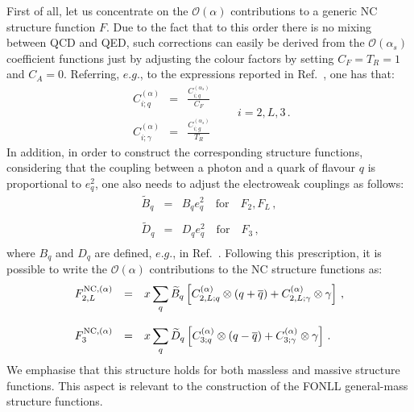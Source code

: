 First of all, let us concentrate on the $\mathcal{O}(\alpha)$
contributions to a generic NC structure function $F$.
%
Due to the fact that to this order there is no mixing between QCD and
QED, such corrections can easily be derived from the
$\mathcal{O}(\alpha_s)$ coefficient functions just by adjusting the
colour factors by setting $C_F=T_R=1$ and $C_A=0$.
%
Referring, $e.g.$, to the expressions reported in
Ref.~\cite{Ellis:1991qj}, one has that:
\begin{equation}\label{eq:alphaCFs}
\begin{array}{rcl}
\displaystyle C_{i;q}^{(\alpha)} &=& \displaystyle \frac{C_{i;q}^{(\alpha_s)}}{C_F}\\
\\
\displaystyle C_{i;\gamma}^{(\alpha)} &=& \displaystyle \frac{C_{i;g}^{(\alpha_s)}}{T_R}
\end{array}\qquad i = 2,L,3\,.
\end{equation}
In addition, in order to construct the corresponding structure
functions, considering that the coupling between a photon and a quark
of flavour $q$ is proportional to $e_q^2$, one also needs to adjust
the electroweak couplings as follows:
 \begin{equation}
\begin{array}{rcl}
\widetilde{B}_q &=& B_qe_q^2\quad\mbox{for}\quad F_2,F_L\,, \\
\\
\widetilde{D}_q &=& D_qe_q^2\quad\mbox{for}\quad F_3\,, \\
\end{array}
\end{equation}
where $B_q$ and $D_q$ are defined, $e.g.$, in
Ref.~\cite{Adloff:2003uh}.
%
Following this prescription, it is possible to write the
$\mathcal{O}(\alpha)$ contributions to the NC structure functions as:
\begin{equation}
\begin{array}{rcl}
F_{2,L}^{{\rm NC},(\alpha)} &=& \displaystyle x \sum_{q} \widetilde{B}_q\left[C_{2,L;q}^{(\alpha)}\otimes
(q+\overline{q}) + C_{2,L;\gamma}^{(\alpha)} \otimes \gamma
                         \right]\,,\\
\\
F_3^{{\rm NC},(\alpha)} &=& \displaystyle x \sum_{q} \widetilde{D}_q\left[C_{3;q}^{(\alpha)}\otimes
(q-\overline{q}) + C_{3;\gamma}^{(\alpha)} \otimes \gamma
                         \right]\,.
\end{array}
\end{equation}
We emphasise that this structure holds for both massless and massive
structure functions. This aspect is relevant to the construction of
the FONLL general-mass structure functions.

